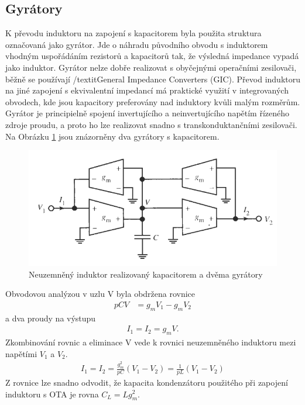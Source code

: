 \subsection{Gyrátory}\label{s:GYR}
\noindent K převodu induktoru na zapojení s kapacitorem byla použita struktura označovaná jako gyrátor. Jde o náhradu původního obvodu s induktorem vhodným uspořádáním rezistorů a kapacitorů tak, že výsledná impedance vypadá jako induktor. Gyrátor nelze dobře realizovat s obyčejnými operačními zesilovači, běžně se používají /textit{General Impedance Converters (GIC)}. Převod induktoru na jiné zapojení s ekvivalentní impedancí má praktické využití v integrovaných obvodech, kde jsou kapacitory preferovány nad induktory kvůli malým rozměrům. Gyrátor je principielně spojení invertujícího a neinvertujícího napětím řízeného zdroje proudu, a proto ho lze realizovat snadno s transkonduktančními zesilovači. Na Obrázku \ref{s:GO} jsou znázorněny dva gyrátory s kapacitorem. 
\begin{figure}[h]
\centering
\includegraphics[scale=0.6]{gyrator.png}
\caption[Neuzemněný induktor realizovaný kapacitorem a dvěma gyrátory]{Neuzemněný induktor realizovaný kapacitorem a dvěma gyrátory \cite{12} \label{s:GO}}
\end{figure}
Obvodovou analýzou v uzlu V byla obdržena rovnice
\begin{align}
pCV &= g_mV_1 - g_mV_2
\end{align}
a dva proudy na výstupu
\begin{align}
I_1 = I_2 = g_mV.
\end{align}
Zkombinování rovnic a eliminace V vede k rovnici neuzemněného induktoru mezi napětími $V_1$ a $V_2$.
\begin{align}
I_1 = I_2 = \frac{g_m^2}{pC}(V_1 - V_2) = \frac{1}{pL}(V_1 - V_2)
\end{align}
Z rovnice lze snadno odvodit, že kapacita kondenzátoru použitého při zapojení induktoru s OTA je rovna $C_L = L g_m ^2$. \\
